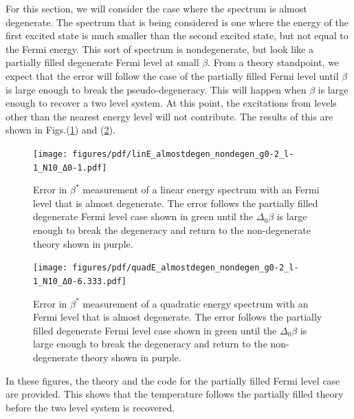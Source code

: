 For this section, we will consider the case where the spectrum is almost degenerate. The spectrum that is being considered is one where the energy of the first excited state is much smaller than the second excited state, but not equal to the Fermi energy. This sort of spectrum is nondegenerate, but look like a partially filled degenerate Fermi level at small $\beta$. From a theory standpoint, we expect that the error will follow the case of the partially filled Fermi level until $\beta$ is large enough to break the pseudo-degeneracy. This will happen when $\beta$ is large enough to recover a two level system. At this point, the excitations from levels other than the nearest energy level will not contribute. The results of this are shown in Figs.\@ (\ref{fig:linE_almostdegen}) and (\ref{fig:quadE_almostdegen}). 
\begin{figure}[H]
    \centering
    \texttt{[image: figures/pdf/linE\_almostdegen\_nondegen\_g0-2\_l-1\_N10\_Δ0-1.pdf]}
    \caption{Error in $\beta^*$ measurement of a linear energy spectrum with an Fermi level that is almost degenerate. The error follows the partially filled degenerate Fermi level case shown in green until the $\Delta_0 \beta$ is large enough to break the degeneracy and return to the non-degenerate theory shown in purple.}
    \label{fig:linE_almostdegen}
\end{figure}

\begin{figure}[H]
    \centering
    \texttt{[image: figures/pdf/quadE\_almostdegen\_nondegen\_g0-2\_l-1\_N10\_Δ0-6.333.pdf]}
    \caption{Error in $\beta^*$ measurement of a quadratic energy spectrum with an Fermi level that is almost degenerate. The error follows the partially filled degenerate Fermi level case shown in green until the $\Delta_0 \beta$ is large enough to break the degeneracy and return to the non-degenerate theory shown in purple.}
    \label{fig:quadE_almostdegen}
\end{figure}
In these figures, the theory and the code for the partially filled Fermi level case are provided. This shows that the temperature follows the partially filled theory before the two level system is recovered.
